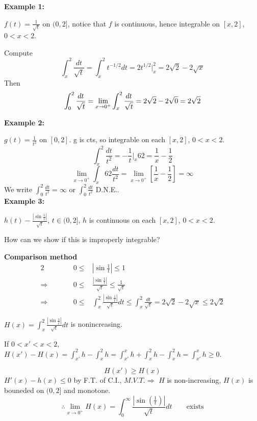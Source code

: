 \documentclass[12pt]{article}
\theoremstyle{plain}
\newcommand{\abs}[1]{\left| #1 \right|}
\begin{document}
{\color{Brown}

	\textbf{Example 1:}

	$f(t) = \frac1{\sqrt t}$ on $(0,2]$, notice that
	$f$ is continuous, hence integrable on $[x,2]$, $0 < x < 2$. 

	Compute 
	\[
		\int_x^2 \frac{dt}{\sqrt t} = \int_x^2 t^{-1/2}dt = 2t^{1/2}
		\bigg\vert_x^2 = 2\sqrt 2-2\sqrt x
	\]
	Then 
	\[
		\int_0^2 \frac{dt}{\sqrt t} = \lim_{x\to 0^+} \int_x^2\frac{dt}
		{\sqrt t} = 2\sqrt 2 - 2\sqrt 0 = 2\sqrt 2\\
	\]
	
	\textbf{Example 2: } 

	$g(t) = \frac 1{t^2}$ on $[0,2]$. g is cts, so 
	integrable on each $[x,2]$, $0 < x < 2$. 
	\[
		\int_x^2\frac{dt}{t^2} = -\frac 1t\bigg\vert_x62 = \frac1x-\frac12
	\]
	\[
		\lim_{x\to 0^+} \int_x62 \frac{dt}{t^2} = \lim_{x\to 0^+}
		[\frac1x-\frac12] = \infty
	\]
	We write $\int_0^2 \frac{dt}{t^2}=\infty$ or $\int_0^2 \frac{dt}{t^2}$
	D.N.E.. \\

	\textbf{Example 3: } 

	$h(t) - \frac{\abs{\sin\frac1t}}{\sqrt t}$, 
	$t\in (0,2]$, $h$ is continuous on each $[x, 2]$, $0 < x < 2$. 

	How can we show if this is improperly integrable? 

	\textbf{Comparison method}
	\begin{alignat*}{2}
		& \qquad & 0\leq& \abs{\sin \frac1t} \leq 1\\
		\Rightarrow & \qquad & 0 \leq& \frac{\abs{\sin \frac 1t}}{\sqrt t}
		\leq \frac1{\sqrt t} \\
		\Rightarrow & \qquad & 0\leq& \int _x^2 \frac{\abs{\sin \frac1t}}
		{\sqrt t} dt \leq \int_x^2 \frac{dt}{\sqrt t} = 2\sqrt 2 - 2\sqrt x
		\leq 2\sqrt 2
	\end{alignat*}
	
	$H(x) = \int_x^2 \frac{\abs{\sin \frac1t}}{\sqrt t}dt$ is nonincreasing.

	If $0<x'<x<2$, $H(x') - H(x) = \int_{x'}^2 h - \int_x^2 h =
	\int_{x'}^x h + \int_x^2 h - \int_x^2 h = \int_{x'}^x h \geq 0$.
	
	\[
		H(x') \geq H(x)
	\]
	$H'(x) - h(x) \leq 0$ by F.T. of C.I., $M.V.T. \Rightarrow$ $H$ is 
	non-increasing, $H(x)$ is bouneded on $(0,2]$ and monotone. 
	\[
		\therefore \lim_{x\to 0^+} H(x) = \int_0^{\infty} 
		\frac{\abs{\sin(\frac 1t)}}{\sqrt t} dt \qquad \text{exists}
	\]
}
\end{document}
